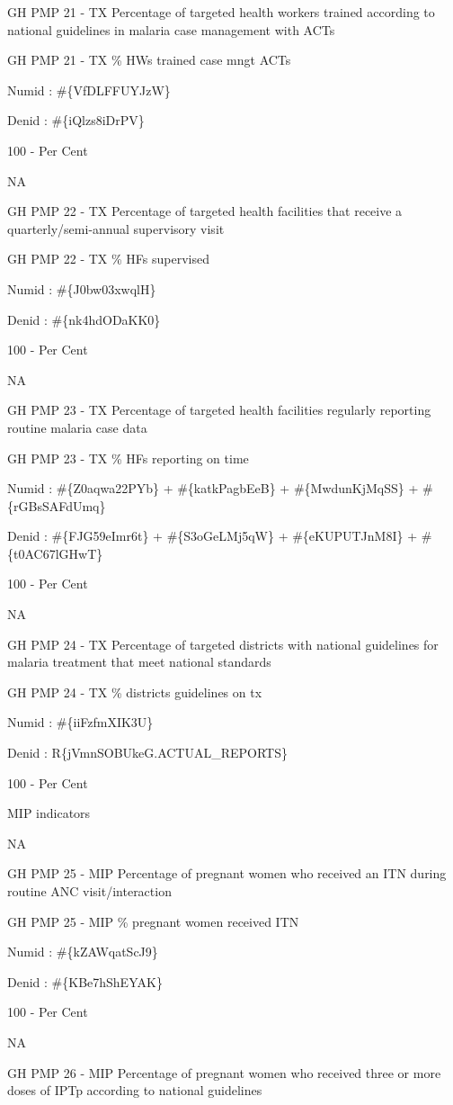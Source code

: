 \documentclass[]{book}
\begin{document}
GH PMP 21 - TX Percentage of targeted health workers trained according to national guidelines in malaria case management with ACTs

GH PMP 21 - TX \% HWs trained case mngt ACTs

Numid : \#\{VfDLFFUYJzW\}

Denid : \#\{iQlzs8iDrPV\}

100 - Per Cent

NA

GH PMP 22 - TX Percentage of targeted health facilities that receive a quarterly/semi-annual supervisory visit

GH PMP 22 - TX \% HFs supervised

Numid : \#\{J0bw03xwqlH\}

Denid : \#\{nk4hdODaKK0\}

100 - Per Cent

NA

GH PMP 23 - TX Percentage of targeted health facilities regularly reporting routine malaria case data

GH PMP 23 - TX \% HFs reporting on time

Numid : \#\{Z0aqwa22PYb\} + \#\{katkPagbEeB\} + \#\{MwdunKjMqSS\} + \#\{rGBsSAFdUmq\}

Denid : \#\{FJG59eImr6t\} + \#\{S3oGeLMj5qW\} + \#\{eKUPUTJnM8I\} + \#\{t0AC67lGHwT\}

100 - Per Cent

NA

GH PMP 24 - TX Percentage of targeted districts with national guidelines for malaria treatment that meet national standards

GH PMP 24 - TX \% districts guidelines on tx

Numid : \#\{iiFzfmXIK3U\}

Denid : R\{jVmnSOBUkeG.ACTUAL\_REPORTS\}

100 - Per Cent

MIP indicators

NA

GH PMP 25 - MIP Percentage of pregnant women who received an ITN during routine ANC visit/interaction

GH PMP 25 - MIP \% pregnant women received ITN

Numid : \#\{kZAWqatScJ9\}

Denid : \#\{KBe7hShEYAK\}

100 - Per Cent

NA

GH PMP 26 - MIP Percentage of pregnant women who received three or more doses of IPTp according to national guidelines
\end{document}
